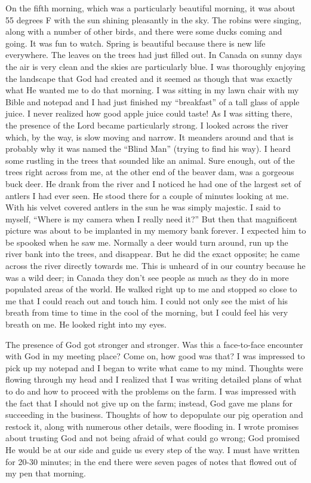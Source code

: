\documentclass[twoside, 12pt]{book}
\begin{document}
On the fifth morning, which was a particularly beautiful morning, it was about 55 degrees F with the sun shining pleasantly in the sky. The robins were singing, along with a number of other birds, and there were some ducks coming and going. It was fun to watch. Spring is beautiful because there is new life everywhere. The leaves on the trees had just filled out. In Canada on sunny days the air is very clean and the skies are particularly blue. I was thoroughly enjoying the landscape that God had created and it seemed as though that was exactly what He wanted me to do that morning. I was sitting in my lawn chair with my Bible and notepad and I had just finished my “breakfast” of a tall glass of apple juice. I never realized how good apple juice could taste! As I was sitting there, the presence of the Lord became particularly strong. I looked across the river which, by the way, is slow moving and narrow. It meanders around and that is probably why it was named the “Blind Man” (trying to find his way). I heard some rustling in the trees that sounded like an animal. Sure enough, out of the trees right across from me, at the other end of the beaver dam, was a gorgeous buck deer. He drank from the river and I noticed he had one of the largest set of antlers I had ever seen. He stood there for a couple of minutes looking at me. With his velvet covered antlers in the sun he was simply majestic. I said to myself, “Where is my camera when I really need it?” But then that magnificent picture was about to be implanted in my memory bank forever. I expected him to be spooked when he saw me. Normally a deer would turn around, run up the river bank into the trees, and disappear. But he did the exact opposite; he came across the river directly towards me. This is unheard of in our country because he was a wild deer; in Canada they don't see people as much as they do in more populated areas of the world. He walked right up to me and stopped so close to me that I could reach out and touch him. I could not only see the mist of his breath from time to time in the cool of the morning, but I could feel his very breath on me. He looked right into my eyes. 

The presence of God got stronger and stronger. Was this a face-to-face encounter with God in my meeting place? Come on, how good was that? I was impressed to pick up my notepad and I began to write what came to my mind. Thoughts were flowing through my head and I realized that I was writing detailed plans of what to do and how to proceed with the problems on the farm. I was impressed with the fact that I should not give up on the farm; instead, God gave me plans for succeeding in the business. Thoughts of how to depopulate our pig operation and restock it, along with numerous other details, were flooding in. I wrote promises about trusting God and not being afraid of what could go wrong; God promised He would be at our side and guide us every step of the way. I must have written for 20-30 minutes; in the end there were seven pages of notes that flowed out of my pen that morning. 
\end{document}
